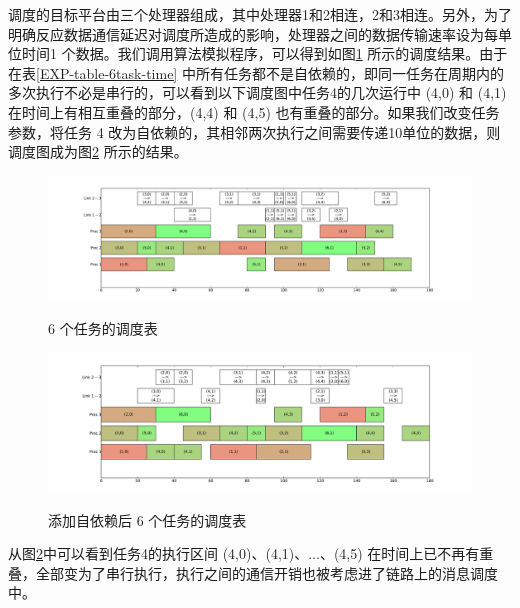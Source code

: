 调度的目标平台由三个处理器组成，其中处理器1和2相连，2和3相连。另外，为了明确反应数据通信延迟对调度所造成的影响，处理器之间的数据传输速率设为每单位时间1 个数据。我们调用算法模拟程序，可以得到如图\ref{EXP-fig-6task-sched1} 所示的调度结果。由于在表\ref{EXP-table-6task-time} 中所有任务都不是自依赖的，即同一任务在周期内的多次执行不必是串行的，可以看到以下调度图中任务4的几次运行中 (4,0) 和 (4,1) 在时间上有相互重叠的部分，(4,4) 和 (4,5) 也有重叠的部分。如果我们改变任务参数，将任务 4 改为自依赖的，其相邻两次执行之间需要传递10单位的数据，则调度图成为图\ref{EXP-fig-6task-sched2} 所示的结果。
\begin{figure}[!hbt]
  \centering
  \includegraphics[width=40em]{figure/EXP-6task-sched1.pdf}\\
  \caption{6 个任务的调度表}\label{EXP-fig-6task-sched1}
\end{figure}
\begin{figure}[!htb]
  \centering
  \includegraphics[width=40em]{figure/EXP-6task-sched2.pdf}\\
  \caption{添加自依赖后 6 个任务的调度表}\label{EXP-fig-6task-sched2}
\end{figure}

从图\ref{EXP-fig-6task-sched2}中可以看到任务4的执行区间 (4,0)、(4,1)、...、(4,5) 在时间上已不再有重叠，全部变为了串行执行，执行之间的通信开销也被考虑进了链路上的消息调度中。

